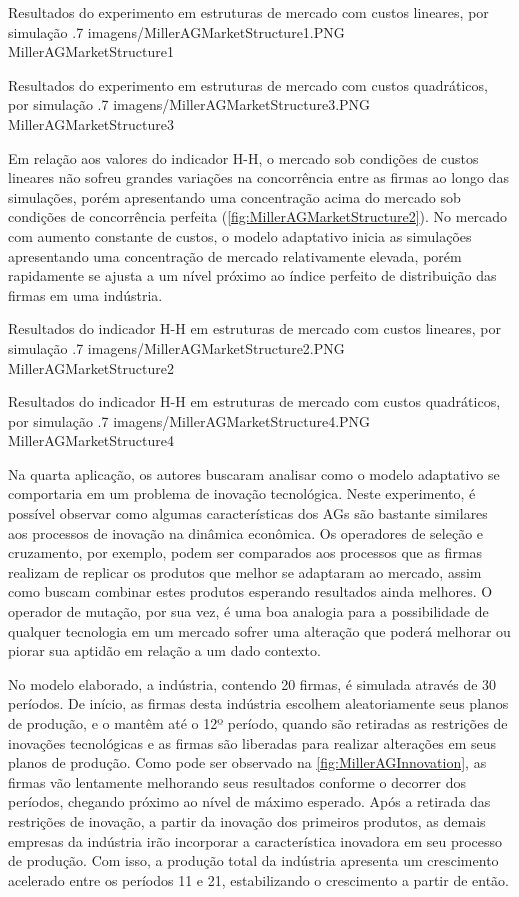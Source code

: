 \figura
	{Resultados do experimento em estruturas de mercado com custos lineares, por simulação}
	{.7}
	{imagens/MillerAGMarketStructure1.PNG}
	{MillerAGMarketStructure1}
	{}
	
\figura
	{Resultados do experimento em estruturas de mercado com custos quadráticos, por simulação}
	{.7}
	{imagens/MillerAGMarketStructure3.PNG}
	{MillerAGMarketStructure3}
	{}

Em relação aos valores do indicador H-H, o mercado sob condições de custos lineares não sofreu grandes variações na concorrência entre as firmas ao longo das simulações, porém apresentando uma concentração acima do mercado sob condições de concorrência perfeita (\autoref{fig:MillerAGMarketStructure2}). No mercado com aumento constante de custos, o modelo adaptativo inicia as simulações apresentando uma concentração de mercado relativamente elevada, porém rapidamente se ajusta a um nível próximo ao índice perfeito de distribuição das firmas em uma indústria.

\figura
	{Resultados do indicador H-H em estruturas de mercado com custos lineares, por simulação}
	{.7}
	{imagens/MillerAGMarketStructure2.PNG}
	{MillerAGMarketStructure2}
	{}

\figura
	{Resultados do indicador H-H em estruturas de mercado com custos quadráticos, por simulação}
	{.7}
	{imagens/MillerAGMarketStructure4.PNG}
	{MillerAGMarketStructure4}
	{}

Na quarta aplicação, os autores buscaram analisar como o modelo adaptativo se comportaria em um problema de inovação tecnológica. Neste experimento, é possível observar como algumas características dos AGs são bastante similares aos processos de inovação na dinâmica econômica. Os operadores de seleção e cruzamento, por exemplo, podem ser comparados aos processos que as firmas realizam de replicar os produtos que melhor se adaptaram ao mercado, assim como buscam combinar estes produtos esperando resultados ainda melhores. O operador de mutação, por sua vez, é uma boa analogia para a possibilidade de qualquer tecnologia em um mercado sofrer uma alteração que poderá melhorar ou piorar sua aptidão em relação a um dado contexto.

No modelo elaborado, a indústria, contendo 20 firmas, é simulada através de 30 períodos. De início, as firmas desta indústria escolhem aleatoriamente seus planos de produção, e o mantêm até o 12º período, quando são retiradas as restrições de inovações tecnológicas e as firmas são liberadas para realizar alterações em seus planos de produção. Como pode ser observado na \autoref{fig:MillerAGInnovation}, as firmas vão lentamente melhorando seus resultados conforme o decorrer dos períodos, chegando próximo ao nível de máximo esperado. Após a retirada das restrições de inovação, a partir da inovação dos primeiros produtos, as demais empresas da indústria irão incorporar a característica inovadora em seu processo de produção. Com isso, a produção total da indústria apresenta um crescimento acelerado entre os períodos 11 e 21, estabilizando o crescimento a partir de então.

